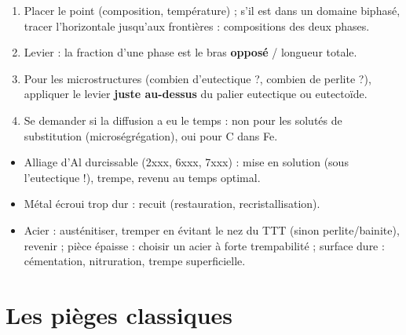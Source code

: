 \begin{exbox}[title={Lire un diagramme de phase}]
\begin{enumerate}
  \item Placer le point (composition, température) ; s'il est dans un domaine biphasé, tracer
        l'horizontale jusqu'aux frontières : compositions des deux phases.
  \item Levier : la fraction d'une phase est le bras \textbf{opposé} / longueur totale.
  \item Pour les microstructures (\og combien d'eutectique ?\fg{}, \og combien de perlite ?\fg{}),
        appliquer le levier \textbf{juste au-dessus} du palier eutectique ou eutectoïde.
  \item Se demander si la diffusion a eu le temps : non pour les solutés de substitution
        (microségrégation), oui pour C dans Fe.
\end{enumerate}
\end{exbox}

\begin{exbox}[title={Choisir un traitement thermique}]
\begin{itemize}
  \item Alliage d'Al durcissable (2xxx, 6xxx, 7xxx) : mise en solution (sous l'eutectique !),
        trempe, revenu au temps optimal.
  \item Métal écroui trop dur : recuit (restauration, recristallisation).
  \item Acier : austénitiser, tremper en évitant le nez du TTT (sinon perlite/bainite), revenir ;
        pièce épaisse : choisir un acier à forte trempabilité ; surface dure : cémentation,
        nitruration, trempe superficielle.
\end{itemize}
\end{exbox}

\section{Les pièges classiques}

